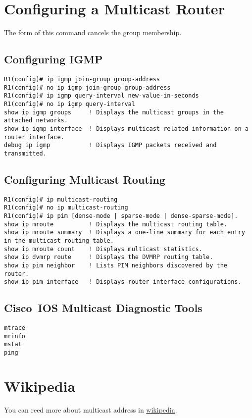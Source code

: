 \documentclass{../UTNetLab}
\begin{document}
\begin{appendices}

\section{Configuring a Multicast Router}
    The  form of this command cancels the group membership.
    \begin{subappendices}
\subsection{Configuring IGMP}
    \begin{lstlisting}[language={cisco}, emph={group-address, new-value-in-seconds}]
R1(config)# ip igmp join-group group-address
R1(config)# no ip igmp join-group group-address
R1(config)# ip igmp query-interval new-value-in-seconds
R1(config)# no ip igmp query-interval
show ip igmp groups     ! Displays the multicast groups in the attached networks.
show ip igmp interface  ! Displays multicast related information on a router interface.
debug ip igmp           ! Displays IGMP packets received and transmitted.
    \end{lstlisting}

\subsection{Configuring Multicast Routing}
    \begin{lstlisting}[language={cisco}]
R1(config)# ip multicast-routing
R1(config)# no ip multicast-routing
R1(config)# ip pim [dense-mode | sparse-mode | dense-sparse-mode].
show ip mroute          ! Displays the multicast routing table.
show ip mroute summary  ! Displays a one-line summary for each entry in the multicast routing table.
show ip mroute count    ! Displays multicast statistics.
show ip dvmrp route     ! Displays the DVMRP routing table.
show ip pim neighbor    ! Lists PIM neighbors discovered by the router.
show ip pim interface   ! Displays router interface configurations.
    \end{lstlisting}

\subsection{Cisco~IOS Multicast Diagnostic Tools}
\begin{lstlisting}[language={cisco}]
mtrace
mrinfo
mstat
ping
\end{lstlisting}
    
\end{subappendices}

\section{Wikipedia}
    You can reed more about multicast address in \href{https://en.wikipedia.org/wiki/Multicast_address}{wikipedia}.

\end{appendices}
\end{document}
